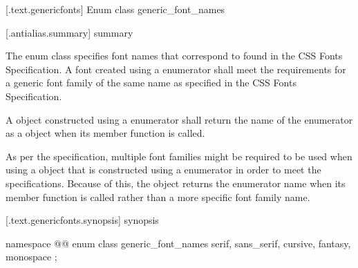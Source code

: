 
 [\iotwod.text.genericfonts] {Enum class generic_font_names}

 [\iotwod.antialias.summary] { summary}

\pnum
The  enum class specifies font names that correspond to  found in the CSS Fonts Specification. A font created using a  enumerator shall meet the requirements for a generic font family of the same name as specified in the CSS Fonts Specification.

\pnum
A  object constructed using a  enumerator shall return the name of the enumerator as a  object when its  member function is called.

\pnum
\begin{note}
As per the specification, multiple font families might be required to be used when using a  object that is constructed using a  enumerator in order to meet the specifications. Because of this, the  object returns the enumerator name when its  member function is called rather than a more specific font family name.
\end{note}

 [\iotwod.text.genericfonts.synopsis] { synopsis}

%
\begin{codeblock}
namespace @\fullnamespace{}@ {
  enum class generic_font_names {
    serif,
    sans_serif,
    cursive,
    fantasy,
    monospace
  };
}
\end{codeblock}
